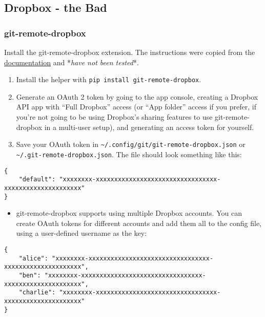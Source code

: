 \documentclass[]{book}
\providecommand{\tightlist}{%
  \setlength{\itemsep}{0pt}\setlength{\parskip}{0pt}}
\begin{document}
\hypertarget{dropbox---the-bad}{%
\subsection{Dropbox - the Bad}\label{dropbox---the-bad}}

\hypertarget{git-remote-dropbox}{%
\subsubsection{git-remote-dropbox}\label{git-remote-dropbox}}

Install the git-remote-dropbox extension. The instructions were copied from the \href{https://github.com/anishathalye/git-remote-dropbox}{documentation} and *\emph{have not been tested}*.

\begin{enumerate}
\def\labelenumi{\arabic{enumi}.}
\tightlist
\item
  Install the helper with \texttt{pip\ install\ git-remote-dropbox}.
\item
  Generate an OAuth 2 token by going to the app console, creating a Dropbox API app with ``Full Dropbox'' access (or ``App folder'' access if you prefer, if you're not going to be using Dropbox's sharing features to use git-remote-dropbox in a multi-user setup), and generating an access token for yourself.
\item
  Save your OAuth token in \texttt{\textasciitilde{}/.config/git/git-remote-dropbox.json} or \texttt{\textasciitilde{}/.git-remote-dropbox.json}. The file should look something like this:
\end{enumerate}

\begin{verbatim}
{
    "default": "xxxxxxxx-xxxxxxxxxxxxxxxxxxxxxxxxxxxxxxxxx-xxxxxxxxxxxxxxxxxxxxx"
}
\end{verbatim}

\begin{itemize}
\tightlist
\item
  git-remote-dropbox supports using multiple Dropbox accounts. You can create OAuth tokens for different accounts and add them all to the config file, using a user-defined username as the key:
\end{itemize}

\begin{verbatim}
{
    "alice": "xxxxxxxx-xxxxxxxxxxxxxxxxxxxxxxxxxxxxxxxxx-xxxxxxxxxxxxxxxxxxxxx",
    "ben": "xxxxxxxx-xxxxxxxxxxxxxxxxxxxxxxxxxxxxxxxxx-xxxxxxxxxxxxxxxxxxxxx",
    "charlie": "xxxxxxxx-xxxxxxxxxxxxxxxxxxxxxxxxxxxxxxxxx-xxxxxxxxxxxxxxxxxxxxx"
}
\end{verbatim}
\end{document}
